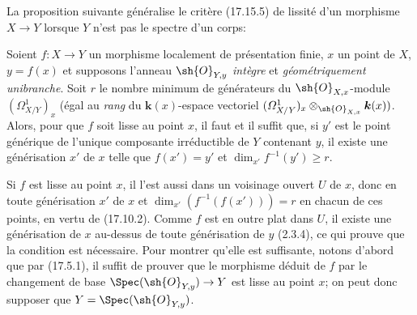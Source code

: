 La proposition suivante généralise le critère (17.15.5) de lissité d'un morphisme $X\to Y$ lorsque $Y$ n'est pas le spectre d'un corps:

\begin{proposition}[18.10.21]
\label{IV.18.10.21}
Soient $f:X\to Y$ un morphisme localement de présentation finie, $x$ un point de $X$, $y=f(x)$ et supposons l'anneau $\sh{O}_{Y,y}$ \emph{intègre} et \emph{géométriquement unibranche}. Soit $r$ le nombre minimum de générateurs du $\sh{O}_{X,x}$-module $(\varOmega^1_{X/Y})_x$ \textup{(égal au \emph{rang} du $\boldsymbol{k}(x)$-espace vectoriel $(\varOmega^1_{X/Y})_x\otimes_{\sh{O}_{X,x}}\boldsymbol{k}(x))$}. Alors, pour que $f$ soit lisse au point $x$, il faut et il suffit que, si $y'$ est le point générique de l'unique composante irréductible de $Y$ contenant $y$, il existe une générisation $x'$ de $x$ telle que $f(x')=y'$ et $\dim_{x'}f^{-1}(y')\geq r$.
\end{proposition}

Si $f$ est lisse au point $x$, il l'est aussi dans un voisinage ouvert $U$ de $x$, donc en toute générisation $x'$ de $x$ et $\dim_{x'}(f^{-1}(f(x')))=r$ en chacun de ces points, en vertu de (17.10.2). Comme $f$ est en outre plat dans $U$, il existe une générisation de $x$ au-dessus de toute générisation de $y$ (2.3.4), ce qui prouve que la condition est nécessaire. Pour montrer qu'elle est suffisante, notons d'abord que par (17.5.1), il suffit de prouver que le morphisme déduit de $f$ par le changement de base $\Spec(\sh{O}_{Y,y})\to Y$ est lisse au point $x$; on peut donc supposer que $Y=\Spec(\sh{O}_{Y,y})$.

